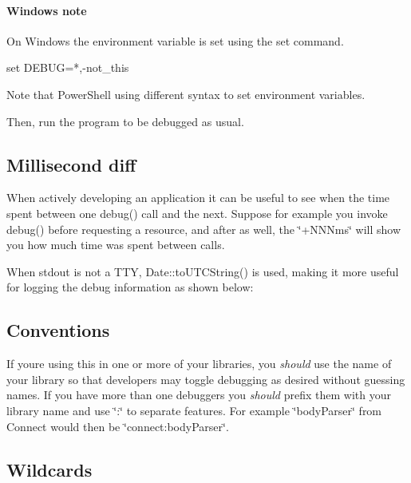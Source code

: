 \paragraph*{Windows note}

On Windows the environment variable is set using the {\ttfamily set} command.


\begin{DoxyCode}
set DEBUG=*,-not\_this
\end{DoxyCode}


Note that Power\+Shell using different syntax to set environment variables.




Then, run the program to be debugged as usual.

\subsection*{Millisecond diff}

When actively developing an application it can be useful to see when the time spent between one {\ttfamily debug()} call and the next. Suppose for example you invoke {\ttfamily debug()} before requesting a resource, and after as well, the \char`\"{}+\+N\+N\+Nms\char`\"{} will show you how much time was spent between calls.



When stdout is not a T\+TY, {\ttfamily Date\+::to\+U\+T\+C\+String()} is used, making it more useful for logging the debug information as shown below\+:



\subsection*{Conventions}

If you\textquotesingle{}re using this in one or more of your libraries, you {\itshape should} use the name of your library so that developers may toggle debugging as desired without guessing names. If you have more than one debuggers you {\itshape should} prefix them with your library name and use \char`\"{}\+:\char`\"{} to separate features. For example \char`\"{}body\+Parser\char`\"{} from Connect would then be \char`\"{}connect\+:body\+Parser\char`\"{}.

\subsection*{Wildcards}

